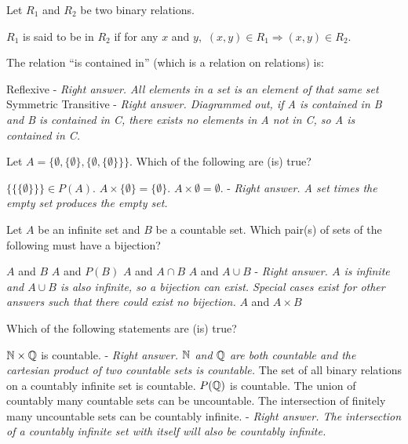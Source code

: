 \begin{questions}

\question Let $R_1$ and $R_2$ be two binary relations. 

$R_1$ is said to be  in $R_2$ if for any $x$ and $y$, $\, (x,y)\in R_1 \Rightarrow (x,y)\in R_2$. 

The relation ``is contained in'' (which is a relation on relations)
is:
\begin{choices}
\choice Reflexive - \textit{Right answer. All elements in a set is an element of that same set}
\choice Symmetric
\choice Transitive - \textit{Right answer. Diagrammed out, if A is contained in B and B is contained in C, there exists no elements in A not in C, so A is contained in C.}
\end{choices}

\vspace{1.8in}

\question Let $A = \Big\{\emptyset,\{\emptyset\},\big\{\emptyset,\{\emptyset\} \big\} \Big\}$. Which of the following are (is) true?
\begin{choices}
\choice $\Big\{\big\{\{\emptyset\}\big\}\Big\} \in P(A)$.
\choice $A \times \{\emptyset\} = \{{\emptyset}\}$.
\choice $A \times \emptyset = \emptyset$. - \textit{Right answer. A set times the empty set produces the empty set.}
\end{choices}
\vspace{0.2in}


\newpage

\question Let $A$ be an infinite set and $B$ be a countable set. Which pair(s) of sets of the following must have a bijection?
\begin{choices}
\choice $A$ and $B$
\choice $A$ and $P(B)$
\choice $A$ and $A \cap B$
\choice $A$ and $A \cup B$ - \textit{Right answer. $A$ is infinite and $A \cup B$ is also infinite, so a bijection can exist. Special cases exist for other answers such that there could exist no bijection.} 
\choice $A$ and $A \times B$
\end{choices}
\vspace{0.2in}

\vspace{1.8in}


\question Which of the following statements are (is) true?
\begin{choices}
\choice ${\mathbb N}{}\times{\mathbb Q}{}$ is countable. - \textit{Right answer. ${\mathbb N}{}$ and ${\mathbb Q}{}$ are both countable and the cartesian product of two countable sets is countable.}
\choice The set of all binary relations on a countably infinite set is countable.
\choice $P({\mathbb Q}{})$ is countable.
\choice The union of countably many countable sets can be uncountable.
\choice The intersection of finitely many uncountable sets can be countably infinite. - \textit{Right answer. The intersection of a countably infinite set with itself will also be countably infinite.}
\end{choices}

\end{questions}
